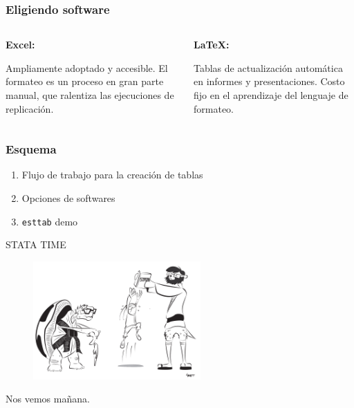 \documentclass[10pt, aspectratio=169, compress]{beamer}
\makeatletter
\def\beamer@writeslidentry@miniframesoff{%
	\expandafter\beamer@ifempty\expandafter{\beamer@framestartpage}{}%
	{%
		\clearpage\beamer@notesactions%
	}
}
\newcommand*{\miniframesoff}{\let\beamer@writeslidentry=\beamer@writeslidentry@miniframesoff}
\makeatother
\begin{document}
\begin{frame}
	\frametitle{Eligiendo software}

	\begin{columns}[t]
		\begin{column}{00.5\textwidth}
			\textbf{Excel:} 

			Ampliamente adoptado y accesible.
			El formateo es un proceso en gran parte manual, que ralentiza las ejecuciones de replicación.
		\end{column}
		\begin{column}{00.5\textwidth}
			\textbf{\LaTeX:}

			Tablas de actualización automática en informes y presentaciones. Costo fijo en el aprendizaje del lenguaje de formateo.
		\end{column}	
	\end{columns}

\end{frame}
\begin{frame}
	\frametitle{Esquema}

	\begin{enumerate}
		\item Flujo de trabajo para la creación de tablas
		\item Opciones de softwares
		\item \texttt{esttab} demo
	\end{enumerate}	

\end{frame}
\miniframesoff 	

\begin{frame}
	\begin{center}
	\LARGE STATA TIME
		\begin{figure}[H]
			\includegraphics[width=0.57\textwidth]{stata.pdf}
		\end{figure}
	\end{center}
\end{frame}
\begin{frame}
	Nos vemos mañana.
\end{frame}
\end{document}

